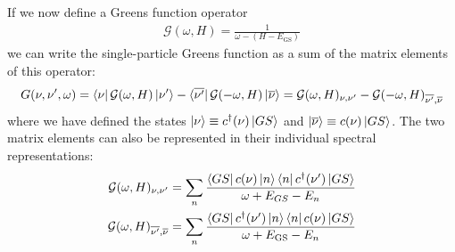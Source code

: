 \documentclass{report}
\numberwithin{equation}{section}
\begin{document}
\begin{appendices}
 If we now define a Greens function operator
 \begin{equation}\begin{aligned}
	 \label{inv_G_func}
	 \mathcal{G}(\omega, H) = \frac{1}{\omega - (H - E_\text{GS})}
 \end{aligned}\end{equation}
 we can write the single-particle Greens function as a sum of the matrix elements of this operator:
 \begin{equation}\begin{aligned}
	 \label{G_mat_el}
	 G(\nu, \nu^\prime, \omega) = \bra{\nu} \mathcal{G}(\omega, H) \ket{\nu^\prime} - \bra{\overline{\nu^\prime}} \mathcal{G}(-\omega, H) \ket{\overline\nu} = \mathcal{G}(\omega, H)_{\nu,\nu^\prime} - \mathcal{G}(-\omega, H)_{\overline{\nu^\prime}, \overline\nu}
 \end{aligned}\end{equation}
 where we have defined the states $\ket{\nu} \equiv c^\dagger(\nu)\ket{GS}$ and $\ket{\overline\nu} \equiv c(\nu)\ket{GS}$. The two matrix elements can also be represented in their individual spectral representations:
 \begin{equation}\begin{aligned}
	 \label{G_mat_spec}
 	\mathcal{G}(\omega, H)_{\nu,\nu^\prime} = \sum_{n}\frac{\bra{GS}c(\nu)\ket{n}\bra{n}c^\dagger(\nu^\prime)\ket{GS}}{\omega + E_{GS} - E_n}\\
	\mathcal{G}(\omega, H)_{\overline{\nu^\prime}, \overline\nu} = \sum_{n}\frac{\bra{GS}c^\dagger(\nu^\prime)\ket{n}\bra{n}c(\nu)\ket{GS}}{\omega + E_\text{GS} - E_n}
 \end{aligned}\end{equation}
 

\end{appendices}
\end{document}
